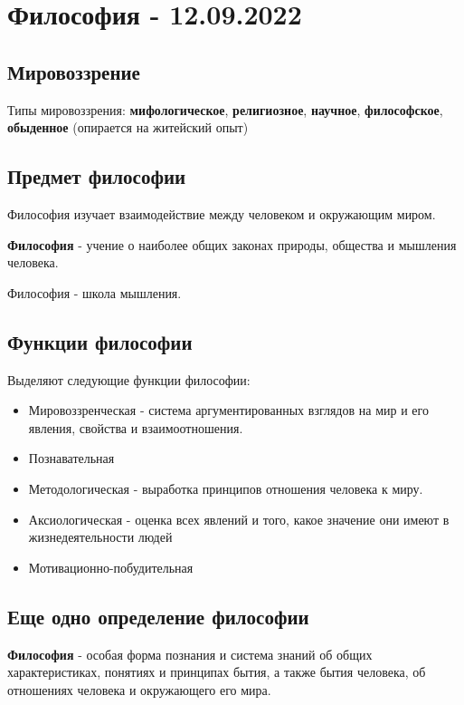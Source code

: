 \documentclass{article}
\begin{document}
\pagebreak
\section{Философия - 12.09.2022}

\subsection{Мировоззрение}

\begin{flushleft}

Типы мировоззрения: \textbf{мифологическое}, \textbf{религиозное}, \textbf{научное}, \textbf{философское}, \textbf{обыденное} (опирается на житейский опыт)

\subsection{Предмет философии}

Философия изучает взаимодействие между человеком и окружающим миром.

\textbf{Философия} - учение о наиболее общих законах природы, общества и мышления человека.

Философия - школа мышления.

\subsection{Функции философии}

Выделяют следующие функции философии:

\begin{itemize}
    \item Мировоззренческая - система аргументированных взглядов на мир и его явления, свойства и взаимоотношения.
    \item Познавательная
    \item Методологическая - выработка принципов отношения человека к миру.
    \item Аксиологическая - оценка всех явлений и того, какое значение они имеют в жизнедеятельности людей
    \item Мотивационно-побудительная
\end{itemize}

\subsection{Еще одно определение философии}

\textbf{Философия} - особая форма познания и система знаний об общих характеристиках, понятиях и принципах бытия, а также бытия человека, об отношениях человека и окружающего его мира.

\end{flushleft}
\end{document}
